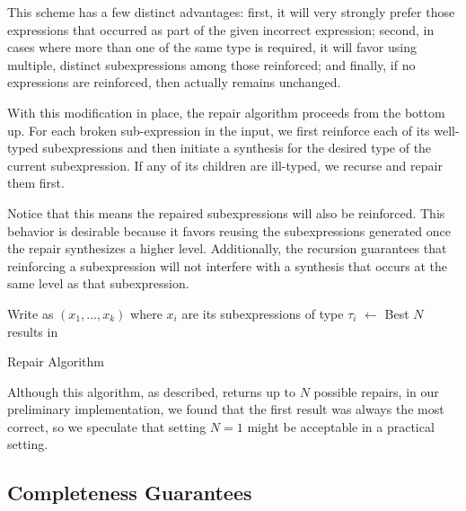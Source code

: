 This scheme has a few distinct advantages: first, it will very
strongly prefer those expressions that occurred as part of the given
incorrect expression; second, in cases where more than one of the same
type is required, it will favor using multiple, distinct
subexpressions among those reinforced; and finally, if no
expressions are reinforced, then \Cost actually remains unchanged.

With this modification in place, the repair algorithm proceeds from
the bottom up. For each broken sub-expression in the input, we first
reinforce each of its well-typed subexpressions and then initiate a
synthesis for the desired type of the current subexpression. If any of
its children are ill-typed, we recurse and repair them first.

Notice that this means the repaired subexpressions will also be
reinforced. This behavior is desirable because it favors reusing the
subexpressions generated once the repair synthesizes a higher
level. Additionally, the recursion guarantees that reinforcing a
subexpression will not interfere with a synthesis that occurs at the
same level as that subexpression.
\begin{algorithm}[hbt]
\BlankLine
{}
Write \Expr as \Expr$(x_1, \ldots, x_k)$ where $x_i$ are its subexpressions of type $\tau_i$ \;
\Repairs $\longleftarrow$ Best $N$ results in \Repairs
\caption{Repair Algorithm}\label{proc:repair}
\end{algorithm}
Although this algorithm, as described, returns up to $N$ possible
repairs, in our preliminary implementation, we found that the first
result was always the most correct, so we speculate that setting $N=1$ might be
acceptable in a practical setting.

\iffalse

\subsection{Completeness Guarantees}

